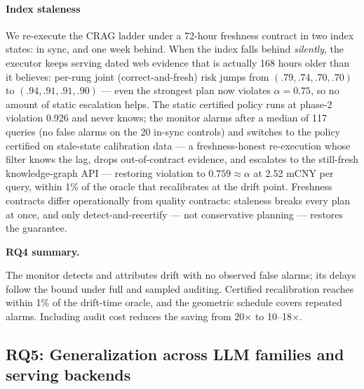 \paragraph{Index staleness}
We re-execute the CRAG ladder under a 72-hour freshness contract in two
index states: in sync, and one week behind. When the index falls behind
\emph{silently}, the executor keeps serving dated web evidence that is
actually 168 hours older than it believes: per-rung joint
(correct-and-fresh) risk jumps from $(.79,.74,.70,.70)$ to
$(.94,.91,.91,.90)$ --- even the strongest plan now violates
$\alpha = 0.75$, so no amount of static escalation helps. The static
certified policy runs at phase-2 violation 0.926 and never knows; the
monitor alarms after a median of 117 queries (no false alarms on the
20 in-sync controls) and switches to the policy certified on stale-state
calibration data --- a freshness-honest re-execution whose filter
knows the lag, drops out-of-contract evidence, and escalates to the
still-fresh knowledge-graph API --- restoring violation to
$0.759 \approx \alpha$ at 2.52 mCNY per query, within 1\% of the
oracle that recalibrates at the drift point. Freshness contracts differ
operationally from quality contracts:
staleness breaks every plan at once, and only detect-and-recertify ---
not conservative planning --- restores the guarantee.

\smallskip\noindent\textbf{RQ4 summary.}\par
The monitor detects and attributes drift with no observed false alarms;
its delays follow the bound under full and sampled auditing. Certified
recalibration reaches within 1\% of the drift-time oracle, and the
geometric schedule covers repeated alarms. Including audit cost reduces
the saving from 20$\times$ to 10--18$\times$.

\subsection{RQ5: Generalization across LLM families and
serving backends}
\label{sec:exp-families}

